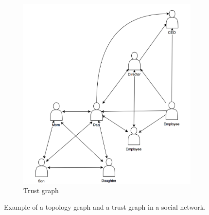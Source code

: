 \begin{figure}
\begin{subfigure}{0.5\textwidth}
\includegraphics[width=\linewidth]{images/socialnetwork_trust.png}
\caption{Trust graph} \label{fig:2_1b}
\end{subfigure}
\caption{Example of a topology graph and a trust graph in a social network.} \label{fig:social_network}
\end{figure}



